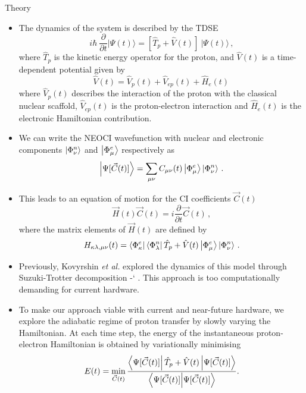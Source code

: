 \documentclass[final,hyperref={pdfpagelabels=false},mathserif]{beamer}
\newcommand*{\citen}[1]{%
  \begingroup
    \romannumeral-`\x %
    \setcitestyle{numbers,square}%
    \cite{#1}%
  \endgroup
}
\begin{document}
\begin{columns}[t]
\begin{column}{40cm}
\begin{block}{Theory}
\begin{itemize}[label=\textbullet, leftmargin=1em]
\item The dynamics of the system is described by the \gls{TDSE}
\begin{equation}
    \label{eq:tdS}
    i \hbar~\frac{\partial}{\partial t} \big|\Psi(t)\big\rangle = \left[ \hat T_p + \hat V(t) \right]~\big|\Psi(t)\big\rangle \, ,
\end{equation}
where $\hat{T}_p$ is the kinetic energy operator for the proton, and $\hat{V}(t)$ is a time-dependent potential given by
\begin{equation}
    \label{eq:Vp}
    \hat V(t) = \hat V_p(t) + \hat V_{ep}(t) + \hat H_e(t) \, 
\end{equation}
where $\hat V_p(t)$ describes the interaction of the proton with the classical nuclear scaffold,
$\hat V_{ep}(t)$ is the proton-electron interaction and  $\hat H_e(t)$ is the electronic Hamiltonian contribution. 
\item We can write the \gls{NEO}CI wavefunction with nuclear and electronic components $\ket{\Phi_{\nu}^n}$ and $\ket{\Phi_{\mu}^e}$ respectively as 
\begin{align}
    \label{eq:neofci}
    \ket{\Psi [\vec{C}(t)]} = \sum_{\mu \nu}C_{\mu \nu}(t) \ket{\Phi_{\mu}^e} \ket{\Phi_{\nu}^n} \, .
\end{align}

\item This leads to an equation of motion for the CI coefficients $\vec{C}(t)$
\begin{equation}\label{eq:motion}
    \vec{H}(t) \vec{C}(t) = i\frac{\partial}{\partial t}\vec{C}(t)\, ,
\end{equation}
where the matrix elements of $\vec{H}(t)$ are defined by
\begin{equation}\label{eq:Ht}
    H_{\kappa \lambda, \mu \nu}(t)=\bra{\Phi^e_{\kappa}}\bra{\Phi^n_{\lambda}} \hat T_p + \hat V(t)\ket{\Phi^e_{\mu}} \ket{\Phi^n_{\nu}} \, .
\end{equation}

\item Previously, Kovyrshin \textit{et al.} explored the dynamics of this model through Suzuki-Trotter decomposition  \citen{kovyrshinNonadiabaticNuclearElectron2023}. This approach is too computationally demanding for current hardware.

\item To make our approach viable with current and near-future hardware, we explore the adiabatic regime of proton transfer by slowly varying the Hamiltonian. At each time step, the energy of the instantaneous proton-electron Hamiltonian is obtained by variationally minimising
\begin{equation}
    \label{eq:AdTr}
    E(t) = \min_{\vec{C}(t)} \frac{\bra{\Psi [\vec{C}(t)]} \hat{T}_p + \hat{V}(t) 
    \ket{\Psi[\vec{C}(t)]}}{\bra{\Psi [\vec{C}(t)]}\ket{\Psi [\vec{C}(t)]}}.
\end{equation}


\end{itemize}
\end{block}
\end{column}
\end{columns}
\end{document}
